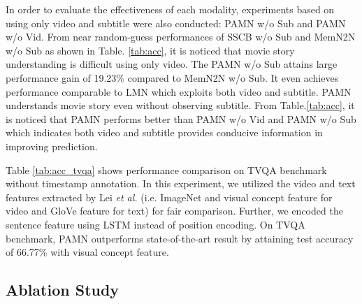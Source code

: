 \documentclass[10pt,twocolumn,letterpaper]{article}
\begin{document}
In order to evaluate the effectiveness of each modality, experiments based on using only video and subtitle were also conducted: PAMN w/o Sub and PAMN w/o Vid. From near random-guess performances of SSCB w/o Sub \cite{MovieQA} and MemN2N w/o Sub \cite{MovieQA} as shown in Table. \ref{tab:acc}, it is noticed that movie story understanding is difficult using only video. The PAMN w/o Sub attains large performance gain of 19.23\% compared to MemN2N w/o Sub. It even achieves performance comparable to LMN \cite{lmn} which exploits both video and subtitle. PAMN understands movie story even without observing subtitle. From Table.\ref{tab:acc}, it is noticed that PAMN performs better than PAMN w/o Vid and PAMN w/o Sub which indicates both video and subtitle provides conducive information in improving prediction. 

Table \ref{tab:acc_tvqa} shows performance comparison on TVQA benchmark without timestamp annotation. In this experiment, we utilized the video and text features extracted by Lei \textit{et al.} \cite{lei2018tvqa} (i.e. ImageNet and visual concept feature for video and GloVe feature for text) for fair comparison. Further, we encoded the sentence feature using LSTM instead of position encoding. On TVQA benchmark, PAMN outperforms state-of-the-art result by attaining test accuracy of 66.77\% with visual concept feature. 


\subsection{Ablation Study}
\label{ssec:4.5}
\end{document}
